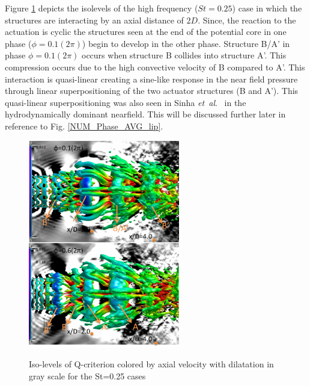 \documentclass[english]{aiaa-tc}
\newcommand*{\etal}{\textit{et~al}.\ }
\begin{document}
Figure \ref{fig:isolevels} depicts the isolevels of the high frequency ($St=0.25$) case in which the structures are interacting by an axial distance of $2D$.
Since, the reaction to the actuation is cyclic the structures seen at the end of the potential core in one phase ($\phi=0.1(2\pi)$) begin to develop in the other phase. Structure B/A' in phase $\phi=0.1(2\pi)$ occurs when structure B collides into structure A'. This compression occurs due to the high convective velocity of B compared to A'. This interaction is quasi-linear creating a sine-like response in the near field pressure through linear superpositioning of the two actuator structures (B and A'). This quasi-linear superpositioning was also seen in Sinha \etal \cite{sinha2013} in the hydrodynamically dominant nearfield. This will be discussed further later in reference to Fig. \ref{NUM_Phase_AVG_lip}.
\begin{figure}
\begin{center}
\begin{centering}
{\includegraphics[width=2.6in]{M09St025qcritphase0106AB}}
\end{centering}
\caption{Iso-levels of Q-criterion colored by axial velocity with dilatation in gray scale for the St=0.25 cases}
\label{fig:isolevels}
\end{center}
\end{figure}
\end{document}
